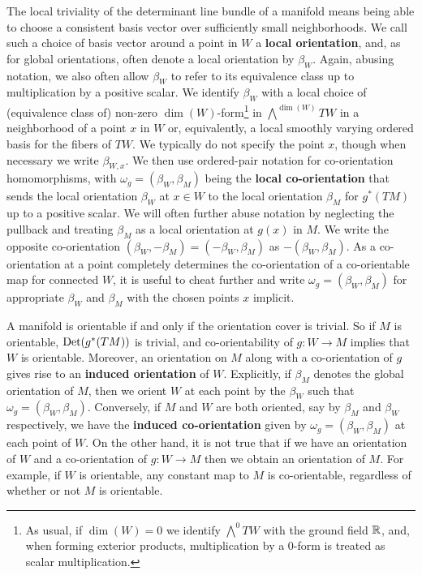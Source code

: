 The local triviality of the determinant line bundle of a manifold means being able to choose a consistent basis vector over sufficiently small neighborhoods.
We call such a choice of basis vector around a point in $W$ a \textbf{local orientation}, and, as for global orientations, often denote a local orientation by $\beta_W$.
Again, abusing notation, we also often allow $\beta_W$ to refer to its equivalence class up to multiplication by a positive scalar.
We identify $\beta_W$ with a local choice of (equivalence class of) non-zero $\dim(W)$-form\footnote{As usual, if $\dim(W) = 0$ we identify $\bigwedge^0 TW$ with the ground field $\mathbb{R}$, and, when forming exterior products, multiplication by a $0$-form is treated as scalar multiplication.} in $\bigwedge^{\dim(W)}TW$ in a neighborhood of a point $x$ in $W$ or, equivalently, a local smoothly varying ordered basis for the fibers of $TW$.
We typically do not specify the point $x$, though when necessary we write $\beta_{W,x}$.
We then use ordered-pair notation for co-orientation homomorphisms, with $\omega_g = (\beta_W, \beta_M)$ being the \textbf{local co-orientation} that sends the local orientation $\beta_W$ at $x \in W$ to the local orientation $\beta_M$ for $g^*(TM)$ up to a positive scalar.
We will often further abuse notation by neglecting the pullback and treating $\beta_M$ as a local orientation at $g(x)$ in $M$.
We write the opposite co-orientation $(\beta_W,-\beta_M) = (-\beta_W,\beta_M)$ as $-(\beta_W,\beta_M)$.
As a co-orientation at a point completely determines the co-orientation of a co-orientable map for connected $W$, it is useful to cheat further and write $\omega_g = (\beta_W,\beta_M)$ for appropriate $\beta_W$ and $\beta_M$ with the chosen points $x$ implicit.

A manifold is orientable if and only if the orientation cover is trivial.
So if $M$ is orientable, ${\rm Det}(g^*(TM))$ is trivial, and co-orientability of $g \colon W \to M$ implies that $W$ is orientable.
Moreover, an orientation on $M$ along with a co-orientation of $g$ gives rise to an \textbf{induced orientation} of $W$.
Explicitly, if $\beta_M$ denotes the global orientation of $M$, then we orient $W$ at each point by the $\beta_W$ such that $\omega_g = (\beta_W,\beta_M)$.
Conversely, if $M$ and $W$ are both oriented, say by $\beta_M$ and $\beta_W$ respectively, we have the \textbf{induced co-orientation} given by $\omega_g = (\beta_W,\beta_M)$ at each point of $W$.
On the other hand, it is not true that if we have an orientation of $W$ and a co-orientation of $g \colon W \to M$ then we obtain an orientation of $M$.
For example, if $W$ is orientable, any constant map to $M$ is co-orientable, regardless of whether or not $M$ is orientable.

